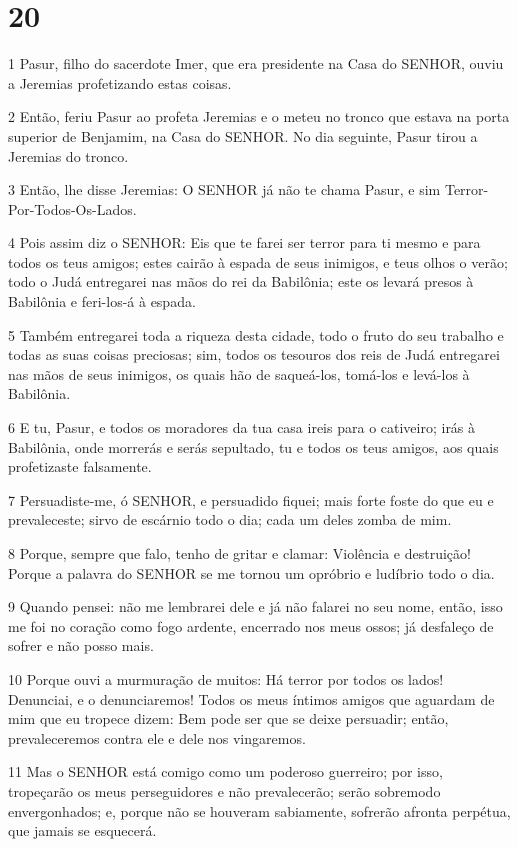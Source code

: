 \chapter{20}

\par 1 Pasur, filho do sacerdote Imer, que era presidente na Casa do SENHOR, ouviu a Jeremias profetizando estas coisas.
\par 2 Então, feriu Pasur ao profeta Jeremias e o meteu no tronco que estava na porta superior de Benjamim, na Casa do SENHOR. No dia seguinte, Pasur tirou a Jeremias do tronco.
\par 3 Então, lhe disse Jeremias: O SENHOR já não te chama Pasur, e sim Terror-Por-Todos-Os-Lados.
\par 4 Pois assim diz o SENHOR: Eis que te farei ser terror para ti mesmo e para todos os teus amigos; estes cairão à espada de seus inimigos, e teus olhos o verão; todo o Judá entregarei nas mãos do rei da Babilônia; este os levará presos à Babilônia e feri-los-á à espada.
\par 5 Também entregarei toda a riqueza desta cidade, todo o fruto do seu trabalho e todas as suas coisas preciosas; sim, todos os tesouros dos reis de Judá entregarei nas mãos de seus inimigos, os quais hão de saqueá-los, tomá-los e levá-los à Babilônia.
\par 6 E tu, Pasur, e todos os moradores da tua casa ireis para o cativeiro; irás à Babilônia, onde morrerás e serás sepultado, tu e todos os teus amigos, aos quais profetizaste falsamente.
\par 7 Persuadiste-me, ó SENHOR, e persuadido fiquei; mais forte foste do que eu e prevaleceste; sirvo de escárnio todo o dia; cada um deles zomba de mim.
\par 8 Porque, sempre que falo, tenho de gritar e clamar: Violência e destruição! Porque a palavra do SENHOR se me tornou um opróbrio e ludíbrio todo o dia.
\par 9 Quando pensei: não me lembrarei dele e já não falarei no seu nome, então, isso me foi no coração como fogo ardente, encerrado nos meus ossos; já desfaleço de sofrer e não posso mais.
\par 10 Porque ouvi a murmuração de muitos: Há terror por todos os lados! Denunciai, e o denunciaremos! Todos os meus íntimos amigos que aguardam de mim que eu tropece dizem: Bem pode ser que se deixe persuadir; então, prevaleceremos contra ele e dele nos vingaremos.
\par 11 Mas o SENHOR está comigo como um poderoso guerreiro; por isso, tropeçarão os meus perseguidores e não prevalecerão; serão sobremodo envergonhados; e, porque não se houveram sabiamente, sofrerão afronta perpétua, que jamais se esquecerá.
